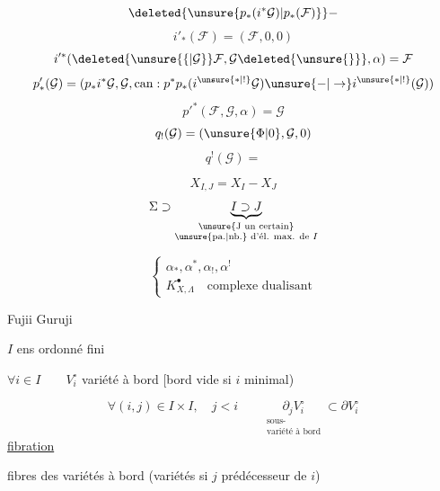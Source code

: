 \[\deleted{\unsure{p_*(i^*\mathcal G)|p_*(\mathcal F)}}-\]
\[
i'_*(\mathcal F)=(\mathcal F,0,0)
\]
\[
i'^*(\deleted{\unsure{\{|\mathcal G}}\mathcal F,\mathcal G\deleted{\unsure{\}}},\alpha)=\mathcal F
\]
\[
p'_*(\mathcal G)=(p_*i^*\mathcal G,\mathcal G,\operatorname{can}:p^*p_*(i^{\unsure{*|!}}\mathcal G)\unsure{-|\to}i^{\unsure{*|!}}(\mathcal G))
\]
\[p'^*(\mathcal F,\mathcal G,\alpha)=\mathcal G\]
\[q_!(\mathcal G)=(\unsure{\Phi|0},\mathcal G,0)\]
\[q^!(\mathcal G)=\]

\[X_{I,J}=X_I-X_J\]
\[
\Sigma\supset\underbrace{I\supset J}_{\substack{\text{\unsure{J un certain}}\\\text{\unsure{pa.|nb.} d'él. max. de }I}}
\]


\[
\left\{\begin{array}{l}
\alpha_*,\alpha^*,\alpha_!,\alpha^!\\
K^\bullet_{X,\Lambda}\quad\text{complexe dualisant}
\end{array}\right.
\]

Fujii Guruji 

$I$ ens ordonné fini

$\forall i\in I\qquad V_i^\circ$ variété à bord [bord vide si $i$ minimal)

\[
\forall(i,j)\in I\times I,\quad j<i\qquad
\underset{\substack{\text{sous-}\\\text{variété à bord}}}{\partial_jV_i^\circ}\subset\partial V_i^\circ
\]
\uline{fibration}

fibres des variétés à bord (variétés  si $j$ prédécesseur de $i$)

